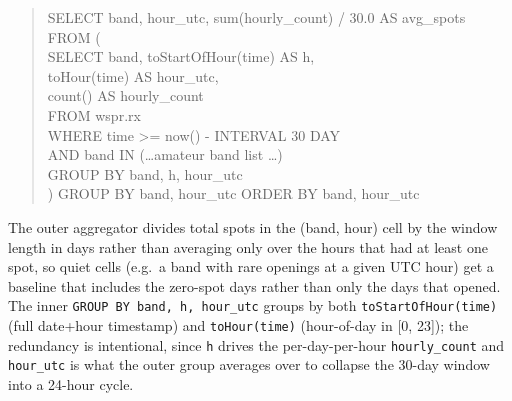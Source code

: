 \documentclass[11pt,a4paper]{article}
\begin{document}
\begin{quote}\small\ttfamily
SELECT band, hour\_utc, sum(hourly\_count) / 30.0 AS avg\_spots\\
FROM (\\
\phantom{x}SELECT band, toStartOfHour(time) AS h,\\
\phantom{xSELECT }toHour(time) AS hour\_utc,\\
\phantom{xSELECT }count() AS hourly\_count\\
\phantom{x}FROM wspr.rx\\
\phantom{x}WHERE time >= now() - INTERVAL 30 DAY\\
\phantom{xWHERE }AND band IN (\dots amateur band list \dots)\\
\phantom{x}GROUP BY band, h, hour\_utc\\
) GROUP BY band, hour\_utc ORDER BY band, hour\_utc
\end{quote}

The outer aggregator divides total spots in the (band, hour)
cell by the window length in days rather than averaging only over
the hours that had at least one spot, so quiet cells (e.g.\ a
band with rare openings at a given UTC hour) get a baseline that
includes the zero-spot days rather than only the days that
opened.  The inner \texttt{GROUP BY band, h, hour\_utc} groups by
both \texttt{toStartOfHour(time)} (full date+hour timestamp) and
\texttt{toHour(time)} (hour-of-day in [0, 23]); the redundancy is
intentional, since \texttt{h} drives the per-day-per-hour
\texttt{hourly\_count} and \texttt{hour\_utc} is what the outer
group averages over to collapse the 30-day window into a 24-hour
cycle.
\end{document}
